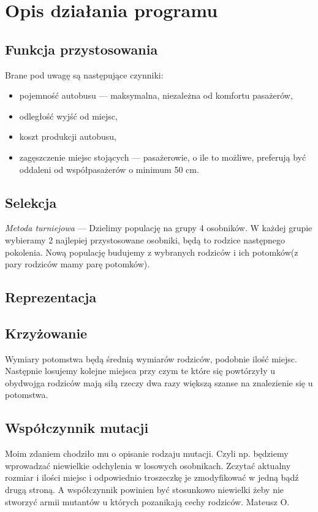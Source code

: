 \documentclass[10pt,a4paper]{article}
\begin{document}
\section{Opis działania programu}


\subsection{Funkcja przystosowania}
Brane pod uwagę są następujące czynniki:
\begin{itemize}
    \item pojemność autobusu --- maksymalna, niezależna od komfortu pasażerów,
    \item odległość wyjść od miejsc,
    \item koszt produkcji autobusu,
    \item zagęszczenie miejsc stojących --- pasażerowie, o ile to możliwe,
      preferują być oddaleni od współpasażerów o minimum 50 cm.
\end{itemize}


\subsection{Selekcja}
\emph{Metoda turniejowa} --- Dzielimy populację na grupy 4 osobników. W każdej grupie wybieramy 2 najlepiej przystosowane osobniki, będą to rodzice następnego pokolenia. Nową populację budujemy z wybranych rodziców i ich potomków(z pary rodziców mamy parę potomków).


\subsection{Reprezentacja} 


\subsection{Krzyżowanie}
Wymiary potomstwa będą średnią wymiarów rodziców, podobnie ilość miejsc.
Następnie losujemy kolejne miejsca przy czym te które się powtórzyły u obydwojga
rodziców mają siłą rzeczy dwa razy większą szanse na znalezienie się u
potomstwa.

\subsection{Współczynnik mutacji}
Moim zdaniem chodziło mu o opisanie rodzaju mutacji. Czyli np. będziemy
wprowadzać niewielkie odchylenia w losowych osobnikach. Zczytać aktualny
rozmiar i ilości miejsc i odpowiednio troszeczkę je zmodyfikować w jedną bądź
drugą stroną.  A współczynnik powinien być stosunkowo niewielki żeby nie
stworzyć armii mutantów u których pozanikają cechy rodziców. Mateusz O. 
\end{document}
